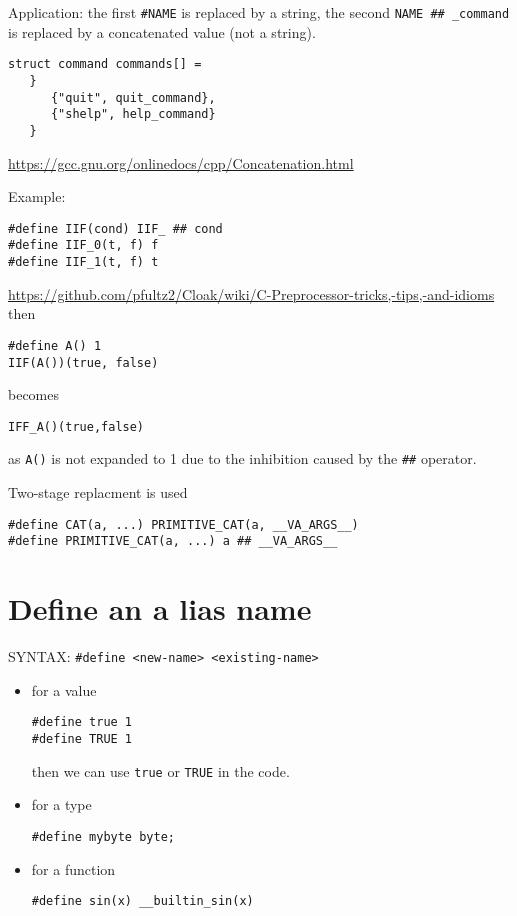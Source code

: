Application: the first \verb!#NAME! is replaced by a string, the
second \verb!NAME ## _command! is replaced by a concatenated value (not a
string).

\begin{verbatim}
struct command commands[] = 
   }
      {"quit", quit_command},
      {"shelp", help_command}
   }
\end{verbatim}
\url{https://gcc.gnu.org/onlinedocs/cpp/Concatenation.html}
 
Example:
\begin{verbatim}
#define IIF(cond) IIF_ ## cond
#define IIF_0(t, f) f
#define IIF_1(t, f) t
\end{verbatim}

\url{https://github.com/pfultz2/Cloak/wiki/C-Preprocessor-tricks,-tips,-and-idioms}
then
\begin{verbatim}
#define A() 1
IIF(A())(true, false) 
\end{verbatim}
becomes
\begin{verbatim}
IFF_A()(true,false)
\end{verbatim}
as \verb!A()! is not expanded to 1 due to the inhibition caused by the \verb!##!
operator.

Two-stage replacment is used
\begin{verbatim}
#define CAT(a, ...) PRIMITIVE_CAT(a, __VA_ARGS__)
#define PRIMITIVE_CAT(a, ...) a ## __VA_ARGS__
\end{verbatim}

\section{Define an a lias name}

SYNTAX: \verb!#define <new-name> <existing-name>!

\begin{itemize}
  \item for a value

\begin{verbatim}
#define true 1
#define TRUE 1
\end{verbatim}
then we can use \verb!true! or \verb!TRUE! in the code.

  \item for a type
\begin{verbatim}
#define mybyte byte;
\end{verbatim}

  \item for a function
  
\begin{verbatim}
#define sin(x) __builtin_sin(x)
\end{verbatim}

\end{itemize}

